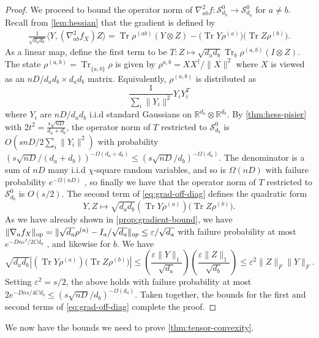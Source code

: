 \documentclass{article}
\DeclarePairedDelimiter{\norm}{\lVert}{\rVert}
\newcommand{\R}{{\mathbb{R}}}
\newcommand{\ot}{\otimes}
\newcommand{\op}{\operatorname{op}}
\newcommand\eps{\varepsilon}
\newcommand\Sym{\mathcal{S}}
\newcommand\rv{X}
\newcommand\tr{\operatorname{Tr}}
\newcommand{\CF}[1]{{\color{purple}[CF: #1]}}
\begin{document}
\begin{proof}
We proceed to bound the operator norm of $\nabla^2_{ab} f: \Sym^0_{d_b} \to \Sym^0_{d_a}$ for $a \neq b$. Recall from \cref{lem:hessian} that the gradient is defined by
\begin{align}\frac1{\sqrt{d_a d_b}} \langle Y,  \left( \nabla^2_{ab} f_{\rv} \right) Z \rangle
= \tr \rho^{(ab)} \left( Y \ot Z \right) - \bigl(\tr Y \rho^{(a)}\bigr)\bigl(\tr Z \rho^{(b)}\bigr).\label{eq:grad-off-diag}\end{align}
As a linear map, define the first term to be $T:Z \mapsto \sqrt{d_a d_b} \tr_b \rho^{(a,b)} (I \ot Z)$. The state $\rho^{(a,b)} = \tr_{\overline{\{a,b\}}} \rho$ is given by $\rho^{{a,b}} =  X X^\dagger/\|X\|^2$ where $X$ is viewed as an $n D/{d_a d_b} \times d_a d_b$ matrix. Equivalently, $\rho^{(a,b)}$ is distributed as 
$$\frac{1}{\sum_{i} \|Y_i\|^2} Y_i Y_i^T$$ where $Y_i$ are $n D/{d_a d_b}$ i.i.d standard Gaussians on $\R^{d_a} \ot \R^{d_b}$. By \cref{thm:hess-pisier} with $2t^2 = \frac {s \sqrt{nD}}{d_a + d_b}$, the operator norm of $T$ restricted to $\Sym^0_{d_b}$ is $O(s n D /2 \sum_i \|Y_i\|^2 )$ 
with probability $(s \sqrt{nD}/(d_a + d_b))^{ - \Omega(d_a + d_b)} \leq (s \sqrt{nD} /d_b)^{ - \Omega(d_a)}$. The denominator is a sum of $nD$ many i.i.d $\chi$-square random variables, and so is $\Omega(nD)$ with failure probability $e^{ -\Omega(nD)} $ \cite{W19}, so finally we have that the operator norm of $T$ restricted to $\Sym^0_{d_b}$ is $O \left( s/2\right)$.
The second term of \cref{eq:grad-off-diag} defines the quadratic form 
$$Y,Z \mapsto \sqrt{d_a d_b} (\tr Y \rho^{(a)})\bigl(\tr Z \rho^{(b)}\bigr).$$ 
As we have already shown in \cref{prop:gradient-bound}, we have $\norm{\nabla_a f_{\rv}}_{\op} = \|\sqrt{d_a} \rho^{(a)} - I_a/\sqrt{d_a}\|_{op} \leq \eps/\sqrt{d_a}$ with failure probability at most $e^{-D n \eps^2/2Cd_a}$ , and likewise for $b$. We have$$\sqrt{d_a d_b} |(\tr Y  \rho^{(a)})\bigl(\tr Z \rho^{(b)}\bigr)| \leq \left( \frac{\eps \|Y\|_{1}}{\sqrt{d_{a}}} \right) \left( \frac{\eps \|Z\|_{1}}{\sqrt{d_{b}}} \right) \leq \eps^2 \|Z\|_F\|Y\|_F.$$
Setting $\eps^2 =  s/2$, the above holds with failure probability at most $2e^{- Dn s /4Cd_b}  \leq (s \sqrt{nD} /d_b)^{ - \Omega(d_a)}.$ Taken together, the bounds for the first and second terms of \cref{eq:grad-off-diag} complete the proof. %
\end{proof}
We now have the bounds we need to prove \cref{thm:tensor-convexity}.
\end{document}
